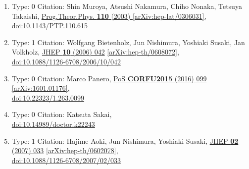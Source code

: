 \documentclass[a4paper,10pt]{article}
\begin{document}
\begin{enumerate}
\begin{enumerate}
  \item Type: 0 Citation: Shin Muroya, Atsushi Nakamura, Chiho Nonaka, Tetsuya Takaishi, \href{https://www.doi.org/10.1143/PTP.110.615}{Prog.Theor.Phys. {\bf 110} (2003) }  \href{https://arxiv.org/abs/hep-lat/0306031}{[arXiv:hep-lat/0306031]},\\\href{https://www.doi.org/10.1143/PTP.110.615}{doi:10.1143/PTP.110.615}
  \item Type: 1 Citation: Wolfgang Bietenholz, Jun Nishimura, Yoshiaki Susaki, Jan Volkholz, \href{https://www.doi.org/10.1088/1126-6708/2006/10/042}{JHEP {\bf 10} (2006) 042}  \href{https://arxiv.org/abs/hep-th/0608072}{[arXiv:hep-th/0608072]},\\\href{https://www.doi.org/10.1088/1126-6708/2006/10/042}{doi:10.1088/1126-6708/2006/10/042}
  \item Type: 0 Citation: Marco Panero, \href{https://www.doi.org/10.22323/1.263.0099}{PoS {\bf CORFU2015} (2016) 099}  \href{https://arxiv.org/abs/1601.01176}{[arXiv:1601.01176]},\\\href{https://www.doi.org/10.22323/1.263.0099}{doi:10.22323/1.263.0099}
  \item Type: 0 Citation: Katsuta Sakai,\\\href{https://www.doi.org/10.14989/doctor.k22243}{doi:10.14989/doctor.k22243}
  \item Type: 1 Citation: Hajime Aoki, Jun Nishimura, Yoshiaki Susaki, \href{https://www.doi.org/10.1088/1126-6708/2007/02/033}{JHEP {\bf 02} (2007) 033}  \href{https://arxiv.org/abs/hep-th/0602078}{[arXiv:hep-th/0602078]},\\\href{https://www.doi.org/10.1088/1126-6708/2007/02/033}{doi:10.1088/1126-6708/2007/02/033}

\end{enumerate}
\end{enumerate}
\end{document}
